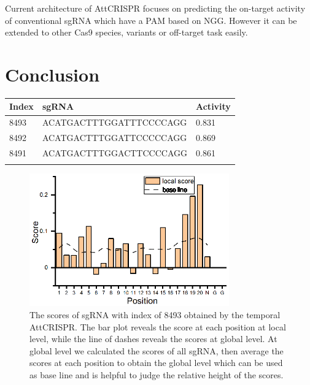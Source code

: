 \documentclass{bioinfo}
\begin{document}
Current architecture of AttCRISPR focuses on predicting the on-target activity of conventional sgRNA which have a PAM based on NGG. 
However it can be extended to other Cas9 species, variants or off-target task easily. 

\section{Conclusion}

\begin{table}[!tpb]
    {\begin{tabular}{@{}lll@{}}\toprule
        Index & sgRNA & Activity \\\midrule
        8493 & ACATGACTTTGGATTTCCCCAGG & 0.831\\
        8492 & ACATGACTTTGGATTCCCCCAGG & 0.869\\
        8491 & ACATGACTTTGGACTTCCCCAGG & 0.861\\
        \botrule
    \end{tabular}}\footnotesize{}
\end{table}
\begin{figure}[!tpb]
    \centerline{\includegraphics[width=86mm]{local0.eps}}
    \caption{
The scores of sgRNA with index of 8493 obtained by the temporal AttCRISPR. 
The bar plot reveals the score at each position at local level, while the line of dashes reveals the scores at global level. 
At global level we calculated the scores of all sgRNA, then average the scores at each position to obtain the global level which can be used as base line and is helpful to judge the relative height of the scores. 
}\label{fig:opt}
\end{figure}
\end{document}
